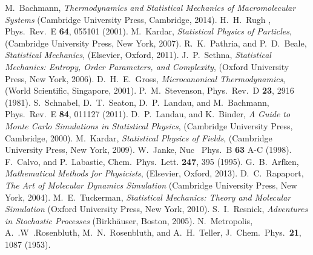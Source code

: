 %
M.~Bachmann, \emph{Thermodynamics and Statistical Mechanics of
Macromolecular Systems}  (Cambridge University Press, Cambridge,
2014).
%
H.~H.~Rugh , Phys.\ Rev.~E \textbf{64},
055101 (2001).
%
%
M.~Kardar, \emph{Statistical Physics of Particles}, (Cambridge University Press, New York, 2007).
%
R.~K.~Pathria, and P.~D.~Beale, \emph{Statistical Mechanics}, (Elsevier, Oxford, 2011).
%
J.~P.~Sethna, \emph{Statistical Mechanics: Entropy, Order Parameters, and Complexity}, 
(Oxford University Press, New York, 2006).
%
%
D.~H.~E.~Gross, \emph{Microcanonical Thermodynamics}, (World Scientific, Singapore,  2001).
%
P.~M.~Stevenson, Phys.\ Rev.~D \textbf{23}, 2916 (1981).
%
S.~Schnabel, D.~T.\ Seaton, D.~P.\ Landau, and M.~Bachmann, Phys.\ Rev.~E
\textbf{84}, 011127 (2011). 
%
%
D.~P.\ Landau, and K.~Binder, \emph{A Guide to Monte Carlo Simulations in Statistical Physics}, (Cambridge University Press, Cambridge, 2000).
%
M.~Kardar, \emph{Statistical Physics of Fields}, (Cambridge University Press, New York, 2009).
%
W.~Janke, Nuc \ Phys.~B \textbf{63} A-C (1998).
%
F.~Calvo, and P.~Labastie,  Chem.\ Phys.\ Lett. \textbf{247}, 395 (1995).
%
G.~B.~Arfken, \emph{Mathematical Methods for Physicists},  (Elsevier, Oxford, 2013).
%
%
D.~C.~Rapaport,  \emph{The Art of Molecular Dynamics Simulation}  (Cambridge University Press, New York,
2004).
M.~E.~Tuckerman, \emph{Statistical Mechanics: Theory and Molecular Simulation} (Oxford University Press, New York, 2010).
%
%
S.~I.~Resnick, \emph{Adventures in Stochastic Processes} (Birkh{\"a}user, Boston, 2005).
%
%
N.~Metropolis, A.~.W~.Rosenbluth, M.~N.~Rosenbluth, and A.~H.~Teller,   J.~Chem.\ Phys.\
\textbf{21}, 1087 (1953).
